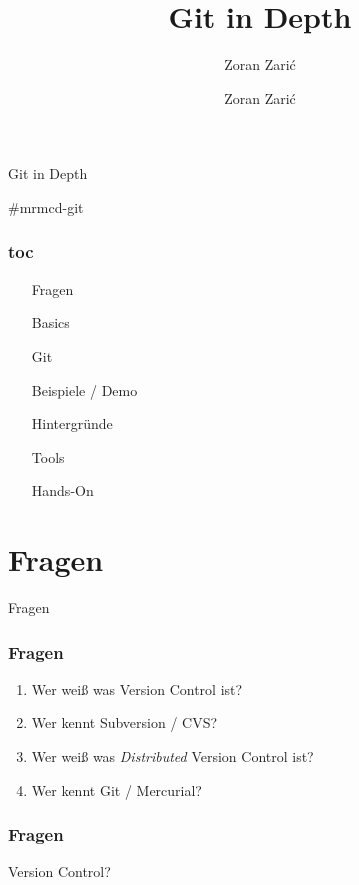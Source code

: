 \documentclass[]{beamer}
\begin{document}

\title[Git]{Git in Depth}
\subtitle[Zoran Zari\'c]{Zoran Zari\'c}
\author[Zoran Zari\'c]{Zoran Zari\'c}

\begin{frame}
	\fontsize{30}{10}\selectfont Git in Depth
	\vspace*{0.5cm}

	\fontsize{20}{10}\selectfont \#mrmcd-git
\end{frame}

\begin{frame}
	\frametitle{toc}
	\begin{enumerate}
		\item
			Fragen
		\item
			Basics
		\item
			Git
		\item
			Beispiele / Demo
		\item
			Hintergründe
		\item
			Tools
		\item
			Hands-On
	\end{enumerate}
\end{frame}

\section{Fragen}
\begin{frame}
	\fontsize{30}{10}\selectfont Fragen
\end{frame}

\begin{frame}
	\frametitle{Fragen}
	\begin{enumerate}
		\item<1->
			Wer weiß was Version Control ist?
		\item<2->
			Wer kennt Subversion / CVS?
		\item<3->
			Wer weiß was \emph{Distributed} Version Control ist?
		\item<4->
			Wer kennt Git / Mercurial?

	\end{enumerate}
\end{frame}

\begin{frame}
	\frametitle{Fragen}
	\Huge{Version Control?}\\
\end{frame}
\end{document}
